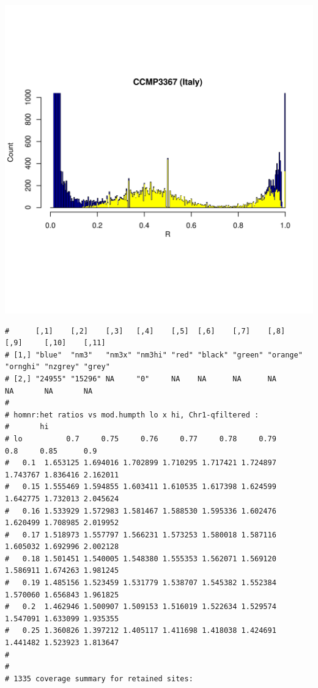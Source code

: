 \documentclass{article}\usepackage[]{graphicx}\usepackage[]{color}
\makeatletter
\def\maxwidth{ %
  \ifdim\Gin@nat@width>\linewidth
    \linewidth
  \else
    \Gin@nat@width
  \fi
}
\newenvironment{kframe}{%
 \def\at@end@of@kframe{}%
 \ifinner\ifhmode%
  \def\at@end@of@kframe{\end{minipage}}%
  \begin{minipage}{\columnwidth}%
 \fi\fi%
 \def\FrameCommand##1{\hskip\@totalleftmargin \hskip-\fboxsep
 \colorbox{shadecolor}{##1}\hskip-\fboxsep
     \hskip-\linewidth \hskip-\@totalleftmargin \hskip\columnwidth}%
 \MakeFramed {\advance\hsize-\width
   \@totalleftmargin\z@ \linewidth\hsize
   \@setminipage}}%
 {\par\unskip\endMakeFramed%
 \at@end@of@kframe}
\newenvironment{knitrout}{}{} %
\makeatother
\begin{document}
\begin{knitrout}
\includegraphics[width=\maxwidth]{FigS7-hwe-histo-figs-knitr/unnamed-chunk-10-53} 
\begin{kframe}\begin{verbatim}
#      [,1]    [,2]    [,3]   [,4]    [,5]  [,6]    [,7]    [,8]     [,9]     [,10]    [,11] 
# [1,] "blue"  "nm3"   "nm3x" "nm3hi" "red" "black" "green" "orange" "ornghi" "nzgrey" "grey"
# [2,] "24955" "15296" NA     "0"     NA    NA      NA      NA       NA       NA       NA
# 
# homnr:het ratios vs mod.humpth lo x hi, Chr1-qfiltered :
#       hi
# lo          0.7     0.75     0.76     0.77     0.78     0.79      0.8     0.85      0.9
#   0.1  1.653125 1.694016 1.702899 1.710295 1.717421 1.724897 1.743767 1.836416 2.162011
#   0.15 1.555469 1.594855 1.603411 1.610535 1.617398 1.624599 1.642775 1.732013 2.045624
#   0.16 1.533929 1.572983 1.581467 1.588530 1.595336 1.602476 1.620499 1.708985 2.019952
#   0.17 1.518973 1.557797 1.566231 1.573253 1.580018 1.587116 1.605032 1.692996 2.002128
#   0.18 1.501451 1.540005 1.548380 1.555353 1.562071 1.569120 1.586911 1.674263 1.981245
#   0.19 1.485156 1.523459 1.531779 1.538707 1.545382 1.552384 1.570060 1.656843 1.961825
#   0.2  1.462946 1.500907 1.509153 1.516019 1.522634 1.529574 1.547091 1.633099 1.935355
#   0.25 1.360826 1.397212 1.405117 1.411698 1.418038 1.424691 1.441482 1.523923 1.813647
# 
# 
# 1335 coverage summary for retained sites:

\end{verbatim}
\end{kframe}
\end{knitrout}
\end{document}
